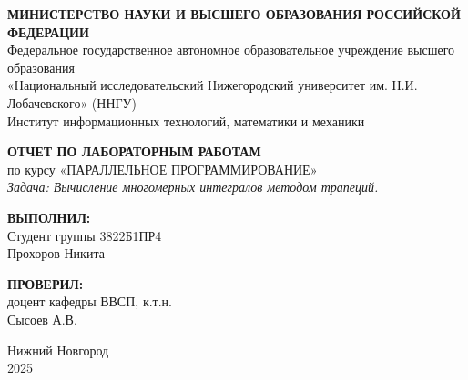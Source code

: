 \documentclass[14pt,a4paper]{extarticle}
\begin{document}
\begin{titlepage}
\begin{center}

\onehalfspacing

\begin{center}
    \textbf{МИНИСТЕРСТВО НАУКИ И ВЫСШЕГО ОБРАЗОВАНИЯ РОССИЙСКОЙ ФЕДЕРАЦИИ} \\
    Федеральное государственное автономное образовательное учреждение высшего образования \\
    «Национальный исследовательский Нижегородский университет им. Н.И. Лобачевского» (ННГУ) \\
    Институт информационных технологий, математики и механики
\end{center}

\vspace{4cm}

\begin{center}
    \textbf{ОТЧЕТ ПО ЛАБОРАТОРНЫМ РАБОТАМ} \vspace{0.5cm}\\
    по курсу «ПАРАЛЛЕЛЬНОЕ ПРОГРАММИРОВАНИЕ» \vspace{0.5cm}\\
    \textit{Задача: Вычисление многомерных интегралов методом трапеций.}
\end{center}

\vspace{4cm}

\begin{flushright}
    \textbf{ВЫПОЛНИЛ:} \\ 
    Студент группы 3822Б1ПР4 \\ 
    Прохоров Никита \\

    \vspace{1cm}

    \textbf{ПРОВЕРИЛ:} \\ 
    доцент кафедры ВВСП, к.т.н. \\ 
    Сысоев А.В.
\end{flushright}

\begin{center}
    Нижний Новгород\\
    2025
\end{center}

\end{center}
\end{titlepage}

\tableofcontents
\newpage
\end{document}

